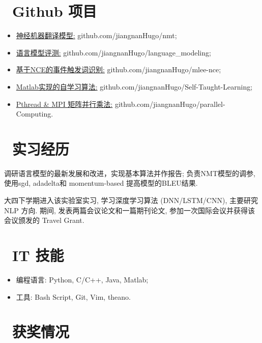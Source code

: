\documentclass{resume}
\begin{document}
\section{\faGithub\ Github 项目}
\begin{itemize}[parsep=0.5ex]
  \item \href{https://github.com/jiangnanHugo/nmt}{神经机器翻译模型:} github.com/jiangnanHugo/nmt;
  \item \href{https://github.com/jiangnanHugo/language_modeling}{语言模型评测:} github.com/jiangnanHugo/language\_modeling;
  \item \href{https://github.com/jiangnanHugo/mlee-nce}{基于NCE的事件触发词识别:} github.com/jiangnanHugo/mlee-nce;
  \item \href{https://github.com/jiangnanHugo/Self-Taught-Learning}{Matlab实现的自学习算法:} github.com/jiangnanHugo/Self-Taught-Learning;
  \item \href{https://github.com/jiangnanHugo/parallel-Computing}{Pthread \& MPI 矩阵并行乘法:} github.com/jiangnanHugo/parallel-Computing.
\end{itemize}

\section{\faUsers\ 实习经历 }
调研语言模型的最新发展和改进，实现基本算法并作报告; 负责NMT模型的调参, 使用sgd, adadelta和 momentum-based 提高模型的BLEU结果.

大四下学期进入该实验室实习, 学习深度学习算法 (DNN/LSTM/CNN), 主要研究 NLP 方向. 期间, 发表两篇会议论文和一篇期刊论文, 参加一次国际会议并获得该会议颁发的 Travel Grant.



\section{\faCogs\ IT 技能}
\begin{itemize}[parsep=0.5ex]
  \item 编程语言: Python, C/C++, Java, Matlab;
  \item 工具: Bash Script, Git, Vim, theano.
\end{itemize}

\section{\faStar\ 获奖情况}
\end{document}
